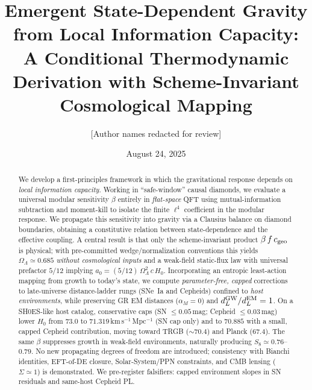 \documentclass[aps,prd,preprint,onecolumn,longbibliography,nofootinbib]{revtex4-2}
\theoremstyle{plain}
\theoremstyle{remark}
\newcommand{\OmL}{\Omega_\Lambda}
\newcommand{\Hzero}{H_0}
\newcommand{\alM}{\alpha_{\!M}}
\newcommand{\be}{\beta}
\newcommand{\Sig}{\Sigma} %
\begin{document}
\title{Emergent State-Dependent Gravity from Local Information Capacity:\\
A Conditional Thermodynamic Derivation with Scheme-Invariant Cosmological Mapping}

\author{[Author names redacted for review]}

\date{August 24, 2025}

\begin{abstract}
We develop a first-principles framework in which the gravitational response depends on \emph{local information capacity}. Working in ``safe-window'' causal diamonds, we evaluate a universal modular sensitivity $\be$ entirely in \textit{flat-space} QFT using mutual-information subtraction and moment-kill to isolate the finite $\ell^4$ coefficient in the modular response. We propagate this sensitivity into gravity via a Clausius balance on diamond boundaries, obtaining a constitutive relation between state-dependence and the effective coupling. A central result is that only the scheme-invariant product $\be\,f\,c_{\rm geo}$ is physical; with pre-committed wedge/normalization conventions this yields $\OmL \simeq 0.685$ \emph{without cosmological inputs} and a weak-field static-flux law with universal prefactor $5/12$ implying $a_0=(5/12)\,\OmL^2\,c\,\Hzero$. Incorporating an entropic least-action mapping from growth to today's state, we compute \emph{parameter-free, capped} corrections to late-universe distance-ladder rungs (SNe~Ia and Cepheids) confined to \emph{host environments}, while preserving GR EM distances ($\alM=0$) and $d_L^{\rm GW}/d_L^{\rm EM}=1$. On a SH0ES-like host catalog, conservative caps (SN $\le 0.05$\,mag; Cepheid $\le 0.03$\,mag) lower $\Hzero$ from $73.0$ to $71.319$\,km\,s$^{-1}$\,Mpc$^{-1}$ (SN cap only) and to $70.885$ with a small, capped Cepheid contribution, moving toward TRGB ($\sim 70.4$) and Planck ($67.4$). The same $\be$ suppresses growth in weak-field environments, naturally producing $S_8 \simeq 0.76$--$0.79$. No new propagating degrees of freedom are introduced; consistency with Bianchi identities, EFT-of-DE closure, Solar-System/PPN constraints, and CMB lensing ($\Sig \simeq 1$) is demonstrated. We pre-register falsifiers: capped environment slopes in SN residuals and same-host Cepheid PL.
\end{abstract}

\maketitle
\end{document}
